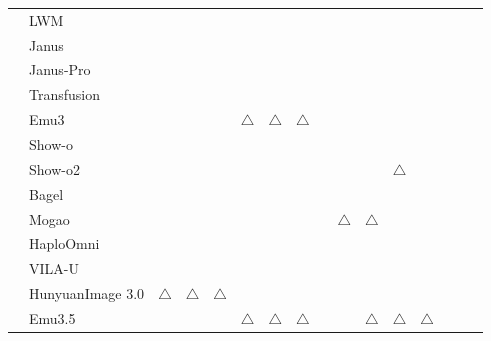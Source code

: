 \documentclass{llmxive}
\providecommand{\cmark}{\checkmark}
\providecommand{\pmark}{\ensuremath{\triangle}}
\providecommand{\cmarkgreen}{{\textbf{\checkmark}}}
\begin{document}
\begin{table}[t]
{\begin{tabular}{
l l
| c c c
| c c c
| c c c
| c c c c
| c
}
& LWM \cite{liu2024world}
& \cmark & \cmark & \cmark
& \cmark & \cmark & \cmark
& \cmark &  &
& \cmark &  &  &
&  \\





& Janus \cite{wu2025janus}
& \cmark & \cmark & \cmark
&  &  &
& \cmark &  &
&  &  &  &
&  \\

& Janus-Pro \cite{chen2025janus}
& \cmark & \cmark & \cmark
&  &  &
& \cmark &  &
&  &  &  &
&  \\

& Transfusion \cite{zhou2024transfusion}
& \cmark & \cmark & \cmark
&  &  &
& \cmark &  &
&  &  &  &
&  \\

& Emu3 \cite{wang2024emu3}
& \cmark & \cmark & \cmark
& \pmark & \pmark & \pmark
& \cmark &  &
& \cmark &  &  &
&  \\

& Show-o \cite{xie2024show}
& \cmark & \cmark & \cmark
&  &  &
& \cmark & \cmark &
&  &  &  &
&  \\

& Show-o2 \cite{xie2025show}
& \cmark & \cmark & \cmark
& \cmark & \cmark & \cmark
& \cmark & \cmark &
& \pmark &  &  &
&  \\

& Bagel \cite{deng2025emerging}
& \cmark & \cmark & \cmark
&  &  & 
& \cmark & \cmark & \cmark
& & &  &
& \cmarkgreen \\

& Mogao \cite{liao2025mogao}
& \cmark & \cmark & \cmark
&  &  &
& \cmark & \pmark & \pmark
&  & &  &
& \\

& HaploOmni \cite{xiao2025haploomni}
& \cmark & \cmark & \cmark
& \cmark & \cmark & \cmark
& \cmark &  &
& \cmark &  &  &
&  \\

& VILA-U \cite{wu2024vila}
& \cmark & \cmark & \cmark
& \cmark & \cmark & \cmark
& \cmark &  &
& \cmark &  &  &
&  \\

& HunyuanImage 3.0 \cite{cao2025hunyuanimage}
& \pmark & \pmark & \pmark
&  &  &
& \cmark & \cmark &
&  &  &  &
&  \\

& Emu3.5 \cite{cui2025emu3}
& \cmark & \cmark & \cmark
& \pmark & \pmark & \pmark
& \cmark & \cmark & \pmark
& \pmark & \pmark &  &
& \cmarkgreen \\


\end{tabular}}
\end{table}
\end{document}
